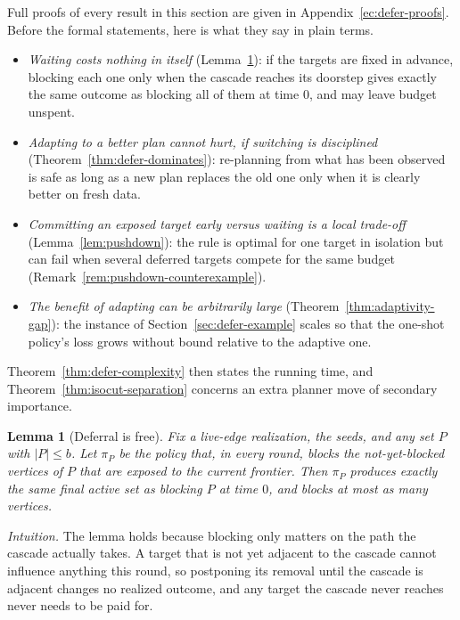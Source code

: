 \documentclass[preprint,11pt]{elsarticle}
\newtheorem{lemma}{Lemma}
\theoremstyle{definition}
\theoremstyle{remark}
\begin{document}
Full proofs of every result in this section are given in
Appendix~\ref{ec:defer-proofs}. Before the formal statements, here
is what they say in plain terms.
\begin{itemize}
\item \emph{Waiting costs nothing in itself} (Lemma~\ref{lem:defer-free}):
  if the targets are fixed in advance, blocking each one only when the
  cascade reaches its doorstep gives exactly the same outcome as blocking
  all of them at time $0$, and may leave budget unspent.
\item \emph{Adapting to a better plan cannot hurt, if switching is
  disciplined} (Theorem~\ref{thm:defer-dominates}): re-planning from what
  has been observed is safe as long as a new plan replaces the old one only
  when it is clearly better on fresh data.
\item \emph{Committing an exposed target early versus waiting is a
  local trade-off} (Lemma~\ref{lem:pushdown}): the rule is optimal for one
  target in isolation but can fail when several deferred targets compete for
  the same budget (Remark~\ref{rem:pushdown-counterexample}).
\item \emph{The benefit of adapting can be arbitrarily large}
  (Theorem~\ref{thm:adaptivity-gap}): the instance of
  Section~\ref{sec:defer-example} scales so that the one-shot policy's
  loss grows without bound relative to the adaptive one.
\end{itemize}
Theorem~\ref{thm:defer-complexity} then states the running time, and
Theorem~\ref{thm:isocut-separation} concerns an extra planner move of
secondary importance.

\begin{lemma}[Deferral is free]\label{lem:defer-free}
Fix a live-edge realization, the seeds, and any set $P$ with $|P|\le b$. Let
$\pi_P$ be the policy that, in every round, blocks the not-yet-blocked
vertices of $P$ that are exposed to the current frontier. Then $\pi_P$
produces exactly the same final active set as blocking $P$ at time $0$, and
blocks at most as many vertices.
\end{lemma}

\emph{Intuition.} The lemma holds because blocking only matters on the
path the cascade actually takes. A target that is not yet adjacent to the
cascade cannot influence anything this round, so postponing its removal until
the cascade is adjacent changes no realized outcome, and any target the
cascade never reaches never needs to be paid for.
\end{document}
